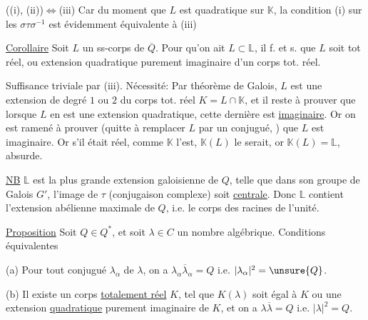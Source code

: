 ((i), (ii))$\Longleftrightarrow$(iii) Car du moment que $L$ est quadratique sur $\mathbb K$, la condition (i) sur les $\sigma\tau\sigma^{-1}$ est évidemment équivalente à (iii)

\uline{Corollaire} Soit $L$ un ss-corps de $\overline Q$. Pour qu'on ait $L\subset\mathbb L$, il f. et s. que $L$ soit tot réel, ou extension quadratique purement imaginaire d'un corps tot. réel.

Suffisance triviale par (iii). Nécessité: Par théorème de Galois, $L$ est une extension de degré $1$ ou $2$ du corps tot. réel $K=L\cap\mathbb K$, et il reste à prouver que lorsque $L$ en est une extension quadratique, cette dernière est  \uline{imaginaire}.
 Or  on est ramené à prouver
(quitte à remplacer $L$ par un conjugué, ) que $L$ est imaginaire. Or s'il était réel, comme $\mathbb K$ l'est, $\mathbb K(L)$ le serait, or $\mathbb K(L)=\mathbb L$, absurde.

\uline{NB} $\mathbb L$ est la plus grande extension galoisienne de $Q$, telle que dans son groupe de Galois $G'$, l'image de $\tau$ (conjugaison complexe) soit \uline{centrale}. Donc $\mathbb L$ contient l'extension abélienne maximale de $Q$, i.e. le corps des racines de l'unité.

\uline{Proposition} Soit $Q\in Q^*$, et soit $\lambda\in C$ un nombre algébrique. Conditions équivalentes

(a) Pour tout conjugué $\lambda_\alpha$ de $\lambda$, on a $\lambda_\alpha\overline\lambda_\alpha=Q$ i.e. $|\lambda_\alpha|^2=\unsure{Q}$.

(b)  Il existe un corps  \uline{totalement réel} $K$, tel que  $K(\lambda)$ soit égal à $K$ ou une extension \uline{quadratique} purement imaginaire de $K$, et on a $\lambda\overline\lambda=Q$ i.e. $|\lambda|^2=Q$.

